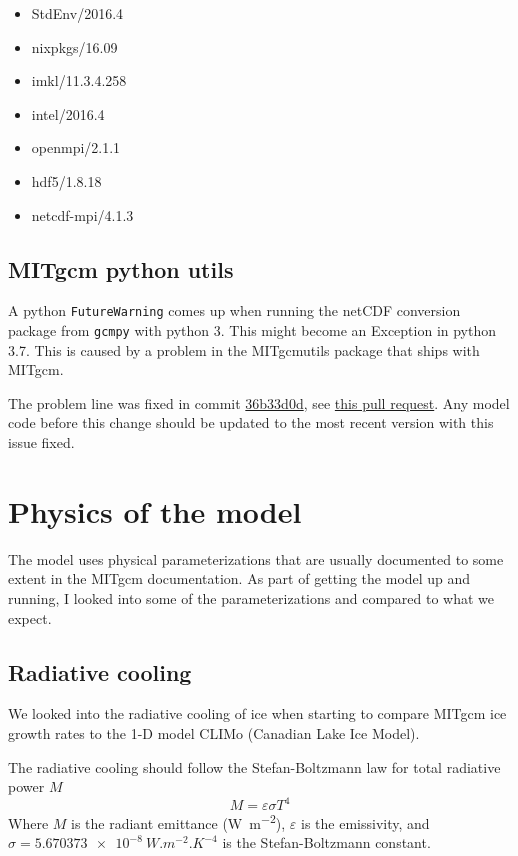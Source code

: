 \documentclass[11pt]{article}
\begin{document}
\begin{itemize}
\item{StdEnv/2016.4}
\item{nixpkgs/16.09}
\item{imkl/11.3.4.258}
\item{intel/2016.4}
\item{openmpi/2.1.1}
\item{hdf5/1.8.18}
\item{netcdf-mpi/4.1.3}
\end{itemize}

\subsection{MITgcm python utils}
A python \verb|FutureWarning| comes up when running the netCDF conversion package from \verb|gcmpy| with python 3. This might become an Exception in python 3.7. This is caused by a problem in the MITgcmutils package that ships with MITgcm.

The problem line was fixed in commit \href{https://github.com/MITgcm/MITgcm/commit/36b33d0052b0c72fb6cc21138bf556aa3c96c9f1}{36b33d0d}, see \href{https://github.com/MITgcm/MITgcm/pull/140}{this pull request}. Any model code before this change should be updated to the most recent version with this issue fixed.

\section{Physics of the model}
The model uses physical parameterizations that are usually documented to some extent in the MITgcm documentation. As part of getting the model up and running, I looked into some of the parameterizations and compared to what we expect.

\subsection{Radiative cooling}
We looked into the radiative cooling of ice when starting to compare MITgcm ice growth rates to the 1-D model CLIMo (Canadian Lake Ice Model).

The radiative cooling should follow the Stefan-Boltzmann law for total radiative power $M$
\begin{equation}
M = \varepsilon \sigma T^4
\end{equation}
Where $M$ is the radiant emittance (\si{W.m^{-2}}), $\varepsilon$ is the emissivity, and $\sigma = \SI{5.670373e-8}{W.m^{-2}.K^{-4}}$ is the Stefan-Boltzmann constant.
\end{document}
